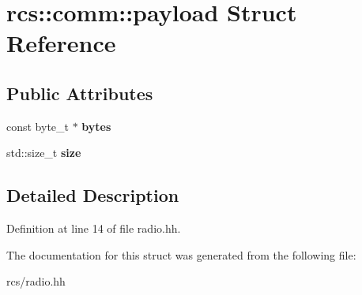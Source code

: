 \hypertarget{structrcs_1_1comm_1_1payload}{}\section{rcs\+:\+:comm\+:\+:payload Struct Reference}
\label{structrcs_1_1comm_1_1payload}
\subsection*{Public Attributes}
\begin{DoxyCompactItemize}
\item 
\mbox{\label{structrcs_1_1comm_1_1payload_a38db3573038d04ed3933b1eda956290c}} 
const byte\+\_\+t $\ast$ {\bfseries bytes}
\item 
\mbox{\label{structrcs_1_1comm_1_1payload_a5c8a274f7af4db1cb97e5874b4de2d61}} 
std\+::size\+\_\+t {\bfseries size}
\end{DoxyCompactItemize}


\subsection{Detailed Description}


Definition at line 14 of file radio.\+hh.



The documentation for this struct was generated from the following file\+:\begin{DoxyCompactItemize}
\item 
rcs/radio.\+hh\end{DoxyCompactItemize}
